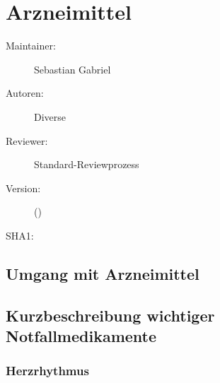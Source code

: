 \chapter
[\CO{[ARZ]} Arzneimittel]
{\CC{[ARZ]} Arzneimittel}
\label{chp:ARZ}




\ChapterIntro
{%

}
{%
\begin{description}
  \item[Maintainer:] Sebastian Gabriel
  \item[Autoren:] Diverse
  \item[Reviewer:] Standard-Reviewprozess
  \item[Version:] {\DocVersion} ({\DocVersionInfo})
  \item[SHA1:] {\DocGitCommit}
\end{description}

{\TxTeilkapitelAASS}
}



\section{Umgang mit Arzneimittel}



\section{Kurzbeschreibung wichtiger Notfallmedikamente}


\subsection{Herzrhythmus}

